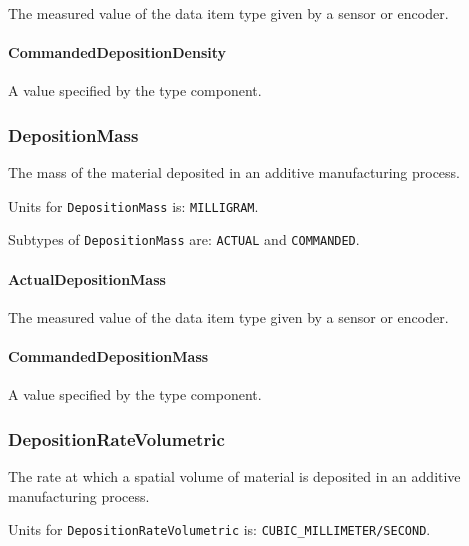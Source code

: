 The measured value of the data item type given by a sensor or encoder.


\paragraph{CommandedDepositionDensity}\mbox{}
\label{sec:CommandedDepositionDensity}



A value specified by the  type component.


\subsubsection{DepositionMass}
\label{sec:DepositionMass}



The mass of the material deposited in an additive manufacturing process.


Units for \texttt{DepositionMass} is: \texttt{MILLIGRAM}.


Subtypes of \texttt{DepositionMass} are: \texttt{ACTUAL} and \texttt{COMMANDED}. 
\FloatBarrier

\paragraph{ActualDepositionMass}\mbox{}
\label{sec:ActualDepositionMass}



The measured value of the data item type given by a sensor or encoder.


\paragraph{CommandedDepositionMass}\mbox{}
\label{sec:CommandedDepositionMass}



A value specified by the  type component.


\subsubsection{DepositionRateVolumetric}
\label{sec:DepositionRateVolumetric}



The rate at which a spatial volume of material is deposited in an additive manufacturing process.


Units for \texttt{DepositionRateVolumetric} is: \texttt{CUBIC_MILLIMETER/SECOND}.


